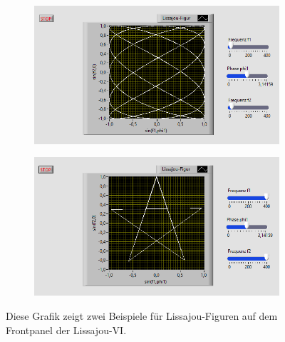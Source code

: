\begin{figure}[H]
	\centering
	\begin{subfigure}[c]{\textwidth}
		\centering
		\includegraphics[width=\textwidth]{pic/LissFront1.png}
	\end{subfigure}
	\begin{subfigure}[c]{\textwidth}
		\centering
		\includegraphics[width=\textwidth]{pic/LissFront2.png}
	\end{subfigure}
	\caption{Diese Grafik zeigt zwei Beispiele für Lissajou-Figuren auf dem Frontpanel der Lissajou-VI.}
	\label{fig:LissajouFront}	
\end{figure}
